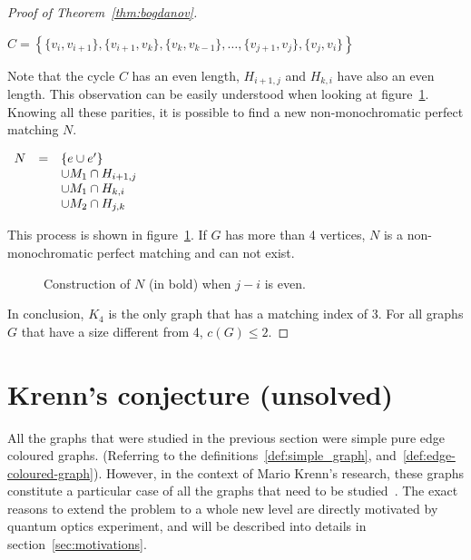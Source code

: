 \begin{proof}[Proof of Theorem~\ref{thm:bogdanov}]
\begin{itemize}
            \begin{center}
                $C = \left\{
                    \{v_i, v_{i + 1}\}, \{v_{i+1}, v_k\}, \{v_k, v_{k - 1}\}, \dots, \{v_{j+1}, v_j\}, \{v_j, v_i\}
                \right\}$
            \end{center}
            
            Note that the cycle $C$ has an even length, $H_{i+1, j}$ and $H_{k, i}$ have also an even length.
            This observation can be easily understood when looking at figure~\ref{fig:proof_simplified_even}.
            Knowing all these parities, it is possible to find a new non-monochromatic perfect matching $N$.
            
            \begin{center}
                $\begin{array}{r c l}
                    N & = & \{e \cup e'\} \\
                      &   & \cup M_1 \cap H_{i+1, j} \\
                      &   & \cup M_1 \cap H_{k, i} \\
                      &   & \cup M_2 \cap H_{j, k}
                \end{array}$
            \end{center}
            
            This process is shown in figure~\ref{fig:proof_simplified_even}.
            If $G$ has more than 4 vertices, $N$ is a non-monochromatic perfect matching and can not exist.
            
            \begin{figure}[H]
                \caption{Construction of $N$ (in bold) when $j - i$ is even.}
                \label{fig:proof_simplified_even}
            \end{figure}
    \end{itemize}

    In conclusion, $K_4$ is the only graph that has a matching index of 3.
    For all graphs $G$ that have a size different from 4, $c(G) \leq 2$.
\end{proof}


\section{Krenn's conjecture (unsolved)}
\label{sec:krenn_conjecture}

All the graphs that were studied in the previous section were simple pure edge coloured graphs.
(Referring to the definitions~\ref{def:simple_graph}, and~\ref{def:edge-coloured-graph}).
However, in the context of Mario Krenn's research, these graphs constitute a particular case of all the graphs that need to be studied~\cite{Krenn_2017,wordpress}.
The exact reasons to extend the problem to a whole new level are directly motivated by quantum optics experiment, and will be described into details in section~\ref{sec:motivations}.

